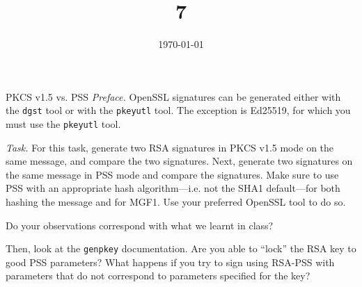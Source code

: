 \documentclass{practice}
\title{7}
\date{\today}
\begin{document}
\maketitle

\begin{task}{PKCS v1.5 vs. PSS}
  \textit{Preface.}
  OpenSSL signatures can be generated either with the \texttt{dgst} tool or with the \texttt{pkeyutl} tool.
  The exception is Ed25519, for which you must use the \texttt{pkeyutl} tool.

  \textit{Task.}
  For this task, generate two RSA signatures in PKCS v1.5 mode on the same message, and compare the two signatures.
  Next, generate two signatures on the same message in PSS mode and compare the signatures.
  Make sure to use PSS with an appropriate hash algorithm---i.e. not the SHA1 default---for both hashing the message and for MGF1.
  Use your preferred OpenSSL tool to do so.
  
  Do your observations correspond with what we learnt in class?

  Then, look at the \texttt{genpkey} documentation.
  Are you able to \enquote{lock} the RSA key to good PSS parameters?
  What happens if you try to sign using RSA-PSS with parameters that do not correspond to parameters specified for the key?
\end{task}
\end{document}
